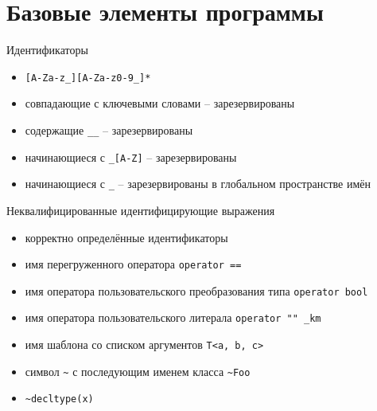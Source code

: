 \documentclass[unknownkeysallowed,xcolor=table]{beamer}
\begin{document}
\section{Базовые элементы программы}

\begin{frame}[fragile]{Идентификаторы}
  \begin{itemize}
    \item \lstinline{[A-Za-z_][A-Za-z0-9_]*} \vspace{1em}
    \item совпадающие с ключевыми словами -- зарезервированы \vspace{1em}
    \item содержащие \lstinline{__} -- зарезервированы \vspace{1em}
    \item начинающиеся с \lstinline{_[A-Z]} -- зарезервированы \vspace{1em}
    \item начинающиеся с \lstinline{_} -- зарезервированы в глобальном пространстве имён
  \end{itemize}
\end{frame}

\begin{frame}[fragile]{Неквалифицированные идентифицирующие выражения}
  \begin{itemize}
    \item корректно определённые идентификаторы \vspace{0.5em}
    \item имя перегруженного оператора \lstinline{operator ==} \vspace{0.5em}
    \item имя оператора пользовательского преобразования типа \lstinline{operator bool} \vspace{0.5em}
    \item имя оператора пользовательского литерала \lstinline{operator "" _km} \vspace{0.5em}
    \item имя шаблона со списком аргументов \lstinline{T<a, b, c>} \vspace{0.5em}
    \item символ \lstinline{~} с последующим именем класса \lstinline{~Foo} \vspace{0.5em}
    \item \lstinline{~decltype(x)}
  \end{itemize}
\end{frame}
\end{document}
